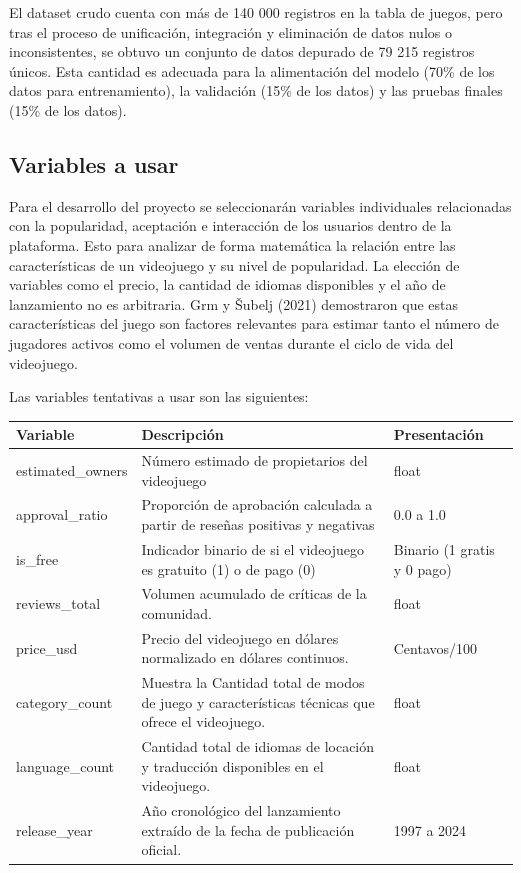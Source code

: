 \documentclass[12pt]{report}
\begin{document}
El dataset crudo cuenta con más de 140 000 registros en la tabla de juegos, pero tras el proceso de unificación, integración y eliminación de datos nulos o inconsistentes, se obtuvo un conjunto de datos depurado de 79 215 registros únicos. Esta cantidad es adecuada para la alimentación del modelo (70\% de los datos para entrenamiento), la validación (15\% de los datos) y las pruebas finales (15\% de los datos).

\subsection*{Variables a usar}
Para el desarrollo del proyecto se seleccionarán variables individuales relacionadas con la popularidad, aceptación e interacción de los usuarios dentro de la plataforma. Esto para analizar de forma matemática la relación entre las características de un videojuego y su nivel de popularidad. La elección de variables como el precio, la cantidad de idiomas disponibles y el año de lanzamiento no es arbitraria. Grm y Šubelj (2021)\cite{grm2021predicting} demostraron que estas características del juego son factores relevantes para estimar tanto el número de jugadores activos como el volumen de ventas durante el ciclo de vida del videojuego.

Las variables tentativas a usar son las siguientes:

\begin{table}[h]
\centering
\begin{tabular}{|p{3cm}|p{8cm}|p{3cm}|}
\hline
\textbf{Variable} & \textbf{Descripción} & \textbf{Presentación} \\ \hline
estimated\_owners & Número estimado de propietarios del videojuego & float \\ \hline
approval\_ratio & Proporción de aprobación calculada a partir de reseñas positivas y negativas & 0.0 a 1.0 \\ \hline
is\_free & Indicador binario de si el videojuego es gratuito (1) o de pago (0) & Binario (1 gratis y 0 pago) \\ \hline
reviews\_total & Volumen acumulado de críticas de la comunidad. & float \\ \hline
price\_usd & Precio del videojuego en dólares normalizado en dólares continuos. & Centavos/100 \\ \hline
category\_count & Muestra la Cantidad total de modos de juego y características técnicas que ofrece el videojuego. & float \\ \hline
language\_count & Cantidad total de idiomas de locación y traducción disponibles en el videojuego. & float \\ \hline
release\_year & Año cronológico del lanzamiento extraído de la fecha de publicación oficial. & 1997 a 2024 \\ \hline
\end{tabular}
\end{table}
\end{document}
